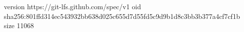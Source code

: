 version https://git-lfs.github.com/spec/v1
oid sha256:801ffd314ec543932bb638d025c655d7d55fd5c9d9b1d8c3bb3b377a4cf7cf1b
size 11068
